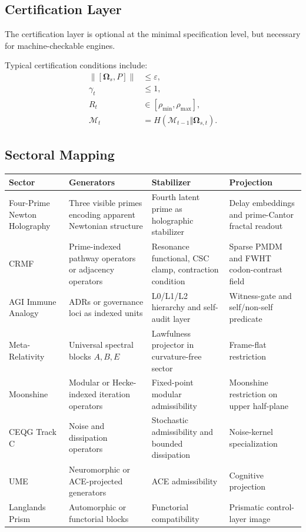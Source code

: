\documentclass[11pt]{article}
\theoremstyle{plain}
\theoremstyle{definition}
\theoremstyle{remark}
\newcommand{\Om}{\boldsymbol{\Omega}}
\newcommand{\norm}[1]{\left\lVert #1 \right\rVert}
\begin{document}
\subsection{Certification Layer}

The certification layer is optional at the minimal specification level, but necessary for machine-checkable engines.

Typical certification conditions include:
\begin{align}
\norm{[\Om_s, P]} &\le \varepsilon, \label{eq:c1}\\
\gamma_t &\le 1, \label{eq:c2}\\
R_t &\in [\rho_{\min},\rho_{\max}], \label{eq:c3}\\
\mathcal{M}_t &= H(\mathcal{M}_{t-1}\Vert \Om_{s,t}). \label{eq:c4}
\end{align}

\subsection{Sectoral Mapping}

\begin{longtable}{>{\raggedright\arraybackslash}p{} >{\raggedright\arraybackslash}p{} >{\raggedright\arraybackslash}p{} >{\raggedright\arraybackslash}p{}}
\toprule
\textbf{Sector} & \textbf{Generators} & \textbf{Stabilizer} & \textbf{Projection} \\
\midrule
Four-Prime Newton Holography &
Three visible primes encoding apparent Newtonian structure &
Fourth latent prime as holographic stabilizer &
Delay embeddings and prime-Cantor fractal readout \\
CRMF &
Prime-indexed pathway operators or adjacency operators &
Resonance functional, CSC clamp, contraction condition &
Sparse PMDM and FWHT codon-contrast field \\
AGI Immune Analogy &
ADRs or governance loci as indexed units &
L0/L1/L2 hierarchy and self-audit layer &
Witness-gate and self/non-self predicate \\
Meta-Relativity &
Universal spectral blocks \(A,B,E\) &
Lawfulness projector in curvature-free sector &
Frame-flat restriction \\
Moonshine &
Modular or Hecke-indexed iteration operators &
Fixed-point modular admissibility &
Moonshine restriction on upper half-plane \\
CEQG Track C &
Noise and dissipation operators &
Stochastic admissibility and bounded dissipation &
Noise-kernel specialization \\
UME &
Neuromorphic or ACE-projected generators &
ACE admissibility &
Cognitive projection \\
Langlands Prism &
Automorphic or functorial blocks &
Functorial compatibility &
Prismatic control-layer image \\
\bottomrule
\end{longtable}
\end{document}
